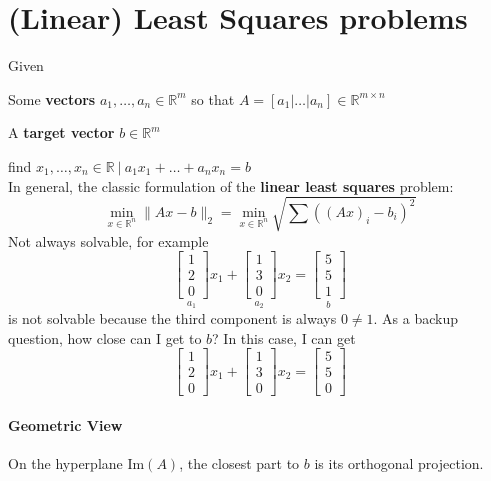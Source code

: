 \documentclass[10pt]{report}
\begin{document}
\section{(Linear) Least Squares problems}
Given 
\begin{list}{}{}
	\item Some \textbf{vectors} $a_1,\ldots,a_n\in \mathbb{R}^m$ so that $A = [a_1|\ldots|a_n]\in \mathbb{R}^{m\times n}$
	\item A \textbf{target vector} $b\in \mathbb{R}^m$
\end{list}
find $x_1,\ldots,x_n\in \mathbb{R}\:|\: a_1x_1 + \ldots + a_n x_n = b$\\
In general, the classic formulation of the \textbf{linear least squares} problem: $$\min_{x\in \mathbb{R}^n} \|Ax - b\|_2 = \min_{x\in \mathbb{R}^n} \sqrt{\sum \left((Ax)_i - b_i\right)^2}$$
Not always solvable, for example $$\underset{a_1}{\left[\begin{array}{c}
1\\2\\0
\end{array}\right]}x_1 + \underset{a_2}{\left[\begin{array}{c}
1\\3\\0
\end{array}\right]}x_2 = \underset{b}{\left[\begin{array}{c}
5\\5\\1
\end{array}\right]}$$ is not solvable because the third component is always $0 \neq 1$. As a backup question, how close can I get to $b$? In this case, I can get $$\left[\begin{array}{c}
1\\2\\0
\end{array}\right]x_1 + \left[\begin{array}{c}
1\\3\\0
\end{array}\right]x_2 = \left[\begin{array}{c}
5\\5\\0
\end{array}\right]$$
\paragraph{Geometric View} On the hyperplane $\text{Im}(A)$, the closest part to $b$ is its orthogonal projection.
\end{document}
